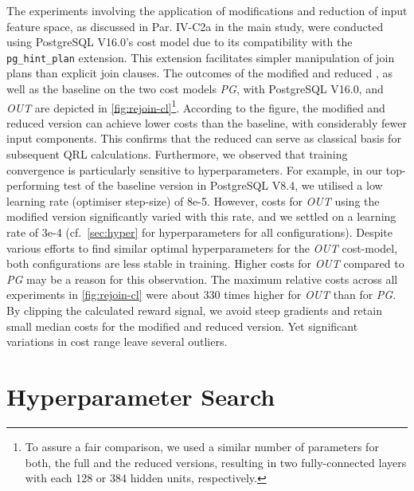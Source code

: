 \documentclass[10pt, conference]{IEEEtran}
\begin{document}
The experiments involving the application of modifications and reduction of input feature space, as discussed in Par. IV-C2a in the main study, were conducted using PostgreSQL V16.0's cost model due to its compatibility with the \texttt{pg\_hint\_plan} extension. This extension facilitates simpler manipulation of join plans than explicit join clauses.
The outcomes of the modified and reduced \rj, as well as the baseline \rj on the two cost models \emph{PG}, with PostgreSQL V16.0, and \emph{OUT} are depicted in \autoref{fig:rejoin-cl}\footnote{To assure a fair comparison, we used a similar number of parameters for both, the full and the reduced \rj versions, resulting in two fully-connected layers with each 128 or 384 hidden units, respectively.}.
According to the figure, the modified and reduced \rj version can achieve lower costs than the baseline, with considerably fewer input components.
This confirms that the reduced \rj can serve as classical basis for subsequent QRL calculations.
Furthermore, we observed that training convergence is particularly sensitive to hyperparameters.
For example, in our top-performing test of the baseline version in PostgreSQL V8.4, we utilised a low learning rate (\ie optimiser step-size) of 8e-5.
However, costs for \emph{OUT} using the modified version significantly varied with this rate, and we settled on a learning rate of 3e-4
(cf.~\autoref{sec:hyper} for hyperparameters for all configurations).
Despite various efforts to find similar optimal hyperparameters for the \emph{OUT} cost-model, both configurations are less stable in training.
Higher costs for \emph{OUT} compared to \emph{PG} may be a reason for this observation.
The maximum relative costs across all experiments in \autoref{fig:rejoin-cl} were about 330 times higher for \emph{OUT} than for \emph{PG}.
By clipping the calculated reward signal, we avoid steep gradients and retain small median costs for the modified and reduced version.
Yet significant variations in cost range leave several outliers.

\section{Hyperparameter Search}
\label{sec:hyper}
\end{document}

